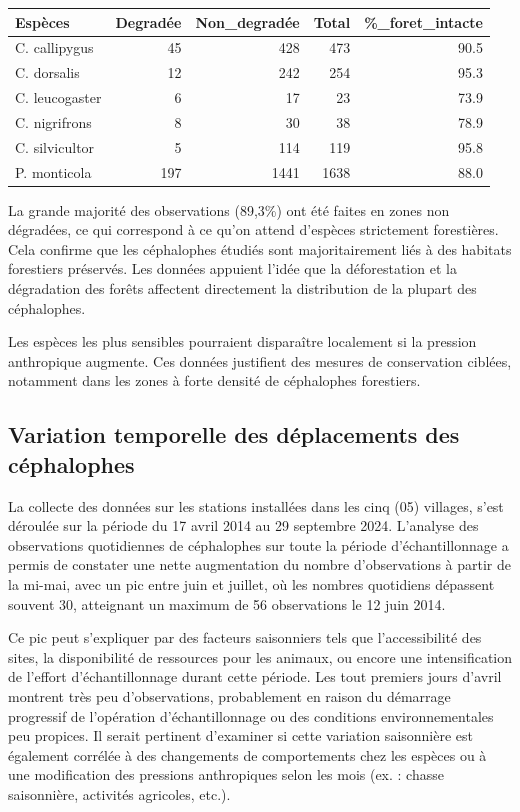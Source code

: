 \documentclass[
]{book}
\begin{document}
\begin{tabular}{l|r|r|r|r}
\hline
Espèces & Degradée & Non\_degradée & Total & \%\_foret\_intacte\\
\hline
C. callipygus & 45 & 428 & 473 & 90.5\\
\hline
C. dorsalis & 12 & 242 & 254 & 95.3\\
\hline
C. leucogaster & 6 & 17 & 23 & 73.9\\
\hline
C. nigrifrons & 8 & 30 & 38 & 78.9\\
\hline
C. silvicultor & 5 & 114 & 119 & 95.8\\
\hline
P. monticola & 197 & 1441 & 1638 & 88.0\\
\hline
\end{tabular}

La grande majorité des observations (89,3\%) ont été faites en zones non dégradées, ce qui correspond à ce qu'on attend d'espèces strictement forestières. Cela confirme que les céphalophes étudiés sont majoritairement liés à des habitats forestiers préservés.
Les données appuient l'idée que la déforestation et la dégradation des forêts affectent directement la distribution de la plupart des céphalophes.

Les espèces les plus sensibles pourraient disparaître localement si la pression anthropique augmente. Ces données justifient des mesures de conservation ciblées, notamment dans les zones à forte densité de céphalophes forestiers.

\subsection{Variation temporelle des déplacements des céphalophes}\label{variation-temporelle-des-duxe9placements-des-cuxe9phalophes}

La collecte des données sur les stations installées dans les cinq (05) villages, s'est déroulée sur la période du 17 avril 2014 au 29 septembre 2024. L'analyse des observations quotidiennes de céphalophes sur toute la période d'échantillonnage a permis de constater une nette augmentation du nombre d'observations à partir de la mi-mai, avec un pic entre juin et juillet, où les nombres quotidiens dépassent souvent 30, atteignant un maximum de 56 observations le 12 juin 2014.

Ce pic peut s'expliquer par des facteurs saisonniers tels que l'accessibilité des sites, la disponibilité de ressources pour les animaux, ou encore une intensification de l'effort d'échantillonnage durant cette période. Les tout premiers jours d'avril montrent très peu d'observations, probablement en raison du démarrage progressif de l'opération d'échantillonnage ou des conditions environnementales peu propices. Il serait pertinent d'examiner si cette variation saisonnière est également corrélée à des changements de comportements chez les espèces ou à une modification des pressions anthropiques selon les mois (ex. : chasse saisonnière, activités agricoles, etc.).
\end{document}
